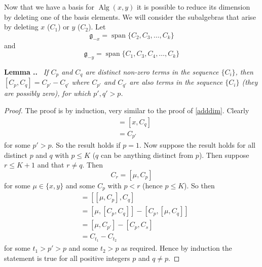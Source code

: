\documentclass[honours]{UNSWthesis}
\newcommand{\g}{\mathfrak{g}}
\newcommand{\1}{\mathbf{e}_{1}}
\newcommand{\2}{\mathbf{e}_{3}}
\newcommand{\3}{\mathbf{e}_{3}}
\DeclareMathOperator{\alg}{Alg}
\DeclareMathOperator{\spn}{span}
\newcounter{Item}[section]
\newenvironment{Lemma}{\medskip
                            \refstepcounter{Item}
                            \noindent
                           {\bf Lemma \thesection.\theItem.}\ %
                            \begingroup \sl}
                           {\endgroup\medskip}
\begin{document}
Now that we have a basis for $\alg(x,y)$ it is possible to reduce its dimension by deleting one of the basis elements. We will consider the subalgebras that arise by deleting $x$ ($C_{1}$) or $y$ ($C_{2}$). \newline
Let 
\[
\g_{-x}=\spn \{ C_{2},C_{3},\ldots,C_{k} \}
\]
and
\[
\g_{-y}=\spn \{C_{1},C_{3},C_{4},\ldots,C_{k} \}
\]

\begin{Lemma}\label{gohigher}
If $C_{p}$ and $C_{q}$ are distinct non-zero terms in the sequence $\{C_{i}\}$, then $[C_{p},C_{q}]= C_{p'}-C_{q'}$ where $C_{p'}$ and $C_{q'}$ are also terms in the sequence $\{C_{i}\}$ (they are possibly zero), for which  $p',q' > p$.
\end{Lemma}
\begin{proof}
The proof is by induction, very similar to the proof of \ref{adddim}. Clearly
\begin{align*}
[C_{1},C_{q}]&=[x,C_{q}]\\
&=C_{p'}
\end{align*}
for some $p'>p$. So the result holds if $p=1$. Now suppose the result holds for all distinct $p$ and $q$ with $p \leq K$ ($q$ can be anything distinct from $p$). Then suppose $r \leq K+1$ and that $r \neq q$. Then
\[
C_{r}=[\mu,C_{p}]
\]
for some $\mu \in \{x,y\}$ and some $C_{p}$ with $p < r$ (hence $p\leq K$). 
\newline
So then 
\begin{align*}
[C_{r},C_{q}]&=[[\mu,C_{p}],C_{q}]\\
&=[\mu,[C_{p},C_{q}]]-[C_{p},[\mu,C_{q}]] \\
&=[\mu,C_{p'}]-[C_{p},C_{s}]\\
&=C_{t_{1}}-C_{t_{2}}
\end{align*}
for some $t_{1}>p'>p$ and some $t_{2}>p$ as required. Hence by induction the statement is true for all positive integers $p$ and $q \neq p$.
\end{proof}
\end{document}
